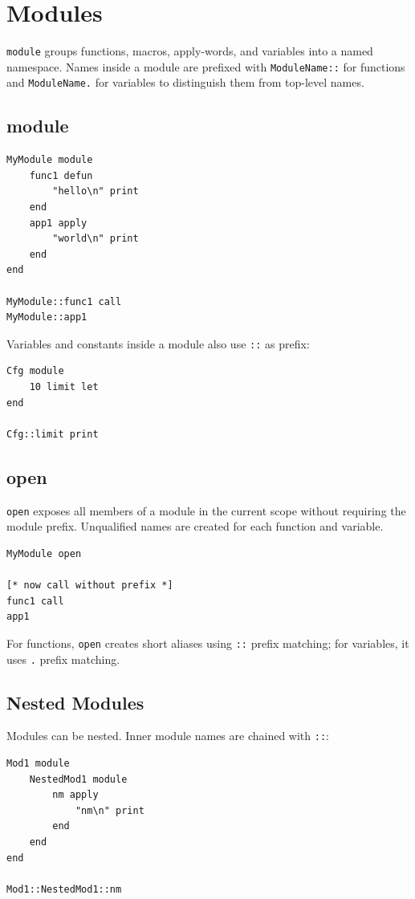 \documentclass[11pt,a4paper]{article}
\newcommand{\code}[1]{\texttt{#1}}
\begin{document}
\section{Modules}

\code{module} groups functions, macros, apply-words, and variables into a
named namespace. Names inside a module are prefixed with \code{ModuleName::}
for functions and \code{ModuleName.} for variables to distinguish them from
top-level names.

\subsection{module}
\begin{lstlisting}[language=Raden]
MyModule module
    func1 defun
        "hello\n" print
    end
    app1 apply
        "world\n" print
    end
end

MyModule::func1 call
MyModule::app1
\end{lstlisting}

Variables and constants inside a module also use \code{::} as prefix:
\begin{lstlisting}[language=Raden]
Cfg module
    10 limit let
end

Cfg::limit print
\end{lstlisting}

\subsection{open}

\code{open} exposes all members of a module in the current scope without
requiring the module prefix. Unqualified names are created for each
function and variable.

\begin{lstlisting}[language=Raden]
MyModule open

[* now call without prefix *]
func1 call
app1
\end{lstlisting}

For functions, \code{open} creates short aliases using \code{::}
prefix matching; for variables, it uses \code{.} prefix matching.

\subsection{Nested Modules}

Modules can be nested. Inner module names are chained with \code{::}:

\begin{lstlisting}[language=Raden]
Mod1 module
    NestedMod1 module
        nm apply
            "nm\n" print
        end
    end
end

Mod1::NestedMod1::nm
\end{lstlisting}
\end{document}
